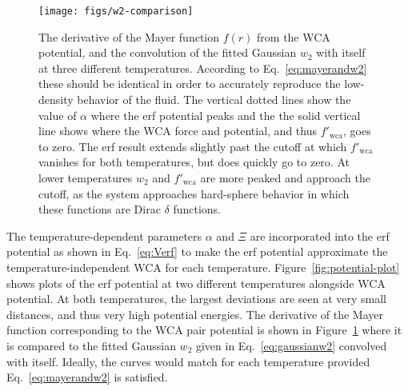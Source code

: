 \documentclass[letterpaper,twocolumn,amsmath,amssymb,prb]{revtex4-1}
\begin{document}
\begin{figure}
\begin{center}
\texttt{[image: figs/w2-comparison]}
\end{center}
\caption{The derivative of the Mayer function $f(r)$ from the WCA
  potential, and the convolution of the fitted Gaussian $w_2$ with
  itself at three different temperatures. According to
  Eq.~\ref{eq:mayerandw2} these should be identical in order to
  accurately reproduce the low-density behavior of the fluid.
  The vertical dotted lines
  show the value of $\alpha$ where the erf potential peaks and
  the the solid vertical line shows where the WCA force and potential,
  and thus $f'_{\mathrm{wca}}$, goes to zero. 
  The erf result extends slightly past the cutoff at which 
  $f'_{\mathrm{wca}}$ vanishes for
  both temperatures, but does quickly go to zero. 
  At lower temperatures $w_2$ and $f'_{\mathrm{wca}}$ are more 
  peaked and approach the cutoff, as
  the system approaches hard-sphere behavior in which these functions
  are Dirac $\delta$ functions. }
\label{fig:w2-comparison}
\end{figure}

The temperature-dependent parameters $\alpha$ and $\Xi$ are incorporated 
into the erf potential as shown in Eq.~\ref{eq:Verf} to make the 
erf potential approximate the temperature-independent WCA for each temperature.
Figure~\ref{fig:potential-plot} 
shows plots of the erf potential at two different 
temperatures alongside WCA potential. At both temperatures, the largest 
deviations are seen at very small distances,
and thus very high potential energies.
The derivative of the Mayer function corresponding to the WCA pair potential 
is shown in Figure~\ref{fig:w2-comparison} where it is compared to the 
fitted Gaussian $w_2$ given in Eq.~\ref{eq:gaussianw2} convolved with itself. 
Ideally, the curves would match for each temperature provided 
Eq.~\ref{eq:mayerandw2} is satisfied.
%
%
% 
%
%
%
%
%
\end{document}
